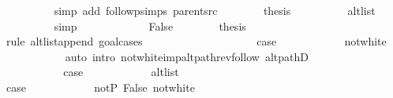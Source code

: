 \begin{isabellebody}
\ \ \ \ \ \ \ \ \isamarkupfalse%
\ {\isacharparenleft}{\kern0pt}simp\ add{\isacharcolon}{\kern0pt}\ follow{\isacharunderscore}{\kern0pt}psimps\ parent{\isacharunderscore}{\kern0pt}src{\isacharparenright}{\kern0pt}\isanewline
\ \ \ \ \ \ \isamarkupfalse%
\ {\isacharquery}{\kern0pt}thesis\isanewline
\ \ \ \ \ \ \ \ \isamarkupfalse%
\ alt{\isacharunderscore}{\kern0pt}list\isanewline
\ \ \ \ \ \ \ \ \isamarkupfalse%
\ simp\isanewline
\ \ \ \ \isamarkupfalse%
\isanewline
\ \ \ \ \ \ \isamarkupfalse%
\ False\isanewline
\ \ \ \ \ \ \isamarkupfalse%
\ {\isacharquery}{\kern0pt}thesis\isanewline
\ \ \ \ \ \ \isamarkupfalse%
\ {\isacharparenleft}{\kern0pt}rule\ alt{\isacharunderscore}{\kern0pt}list{\isacharunderscore}{\kern0pt}append{\isacharunderscore}{\kern0pt}{}{\isacharprime}{\kern0pt}{\isacharcomma}{\kern0pt}\ goal{\isacharunderscore}{\kern0pt}cases{\isacharparenright}{\kern0pt}\isanewline
\ \ \ \ \ \ \ \ \isamarkupfalse%
\ {}\isanewline
\ \ \ \ \ \ \ \ \isamarkupfalse%
\ {\isacharquery}{\kern0pt}case\isanewline
\ \ \ \ \ \ \ \ \ \ \isamarkupfalse%
\ not{\isacharunderscore}{\kern0pt}white\isanewline
\ \ \ \ \ \ \ \ \ \ \isamarkupfalse%
\ {\isacharparenleft}{\kern0pt}auto\ intro{\isacharcolon}{\kern0pt}\ not{\isacharunderscore}{\kern0pt}white{\isacharunderscore}{\kern0pt}imp{\isacharunderscore}{\kern0pt}alt{\isacharunderscore}{\kern0pt}path{\isacharunderscore}{\kern0pt}rev{\isacharunderscore}{\kern0pt}follow\ alt{\isacharunderscore}{\kern0pt}pathD{\isacharparenleft}{\kern0pt}{}{\isacharparenright}{\kern0pt}{\isacharparenright}{\kern0pt}\isanewline
\ \ \ \ \ \ \isamarkupfalse%
\isanewline
\ \ \ \ \ \ \ \ \isamarkupfalse%
\ {}\isanewline
\ \ \ \ \ \ \ \ \isamarkupfalse%
\ {\isacharquery}{\kern0pt}case\isanewline
\ \ \ \ \ \ \ \ \ \ \isamarkupfalse%
\ alt{\isacharunderscore}{\kern0pt}list\isanewline
\ \ \ \ \ \ \ \ \ \ \isacommand{{\isachardot}{\kern0pt}}\isamarkupfalse%
\isanewline
\ \ \ \ \ \ \isamarkupfalse%
\isanewline
\ \ \ \ \ \ \ \ \isamarkupfalse%
\ {}\isanewline
\ \ \ \ \ \ \ \ \isamarkupfalse%
\ {\isacharquery}{\kern0pt}case\isanewline
\ \ \ \ \ \ \ \ \ \ \isamarkupfalse%
\ not{\isacharunderscore}{\kern0pt}P{\isacharprime}{\kern0pt}\ False\ not{\isacharunderscore}{\kern0pt}white\isanewline

\end{isabellebody}
